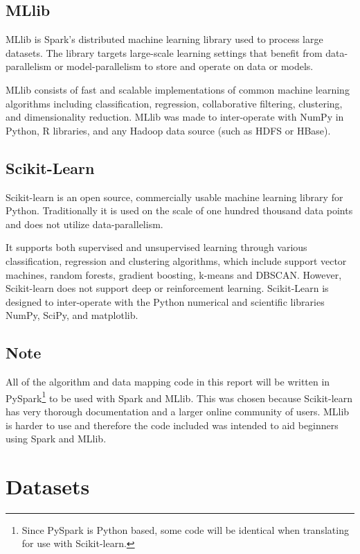\documentclass[9pt,twocolumn,twoside]{idsi}
\begin{document}
\subsection{MLlib}
MLlib is Spark's distributed machine learning library used to process large datasets. The library targets large-scale learning settings that benefit from data-parallelism or model-parallelism to store and operate on data or models. 

MLlib consists of fast and scalable implementations of common machine learning algorithms including classification, regression, collaborative filtering, clustering, and dimensionality reduction. MLlib was made to inter-operate with NumPy in Python, R libraries, and any Hadoop data source (such as HDFS or HBase). {\tiny\cite{mllib}} 

\subsection{Scikit-Learn}
Scikit-learn is an open source, commercially usable machine learning library for Python. Traditionally it is used on the scale of one hundred thousand data points and does not utilize data-parallelism.

It supports both supervised and unsupervised learning through various classification, regression and clustering algorithms, which include support vector machines, random forests, gradient boosting, k-means and DBSCAN. However, Scikit-learn does not support deep or reinforcement learning. Scikit-Learn is designed to inter-operate with the Python numerical and scientific libraries NumPy, SciPy, and matplotlib. {\tiny\cite{pedregosa2011scikit}} 


\subsection{Note}
All of the algorithm and data mapping code in this report will be written in PySpark\footnote{Since PySpark is Python based, some code will be identical when translating for use with Scikit-learn.} to be used with Spark and MLlib. This was chosen because Scikit-learn has very thorough documentation and a larger online community of users. MLlib is harder to use and therefore the code included was intended to aid beginners using Spark and MLlib.

\section{Datasets}
\end{document}
